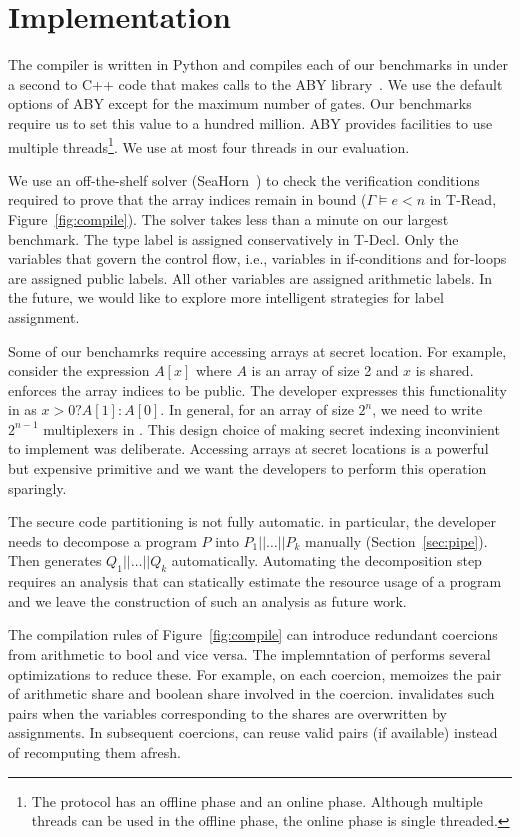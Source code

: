 \section{Implementation}
\label{sec:impl}
The  \tool compiler is written in Python and
compiles each of our benchmarks in under a second to C++ code that makes calls to the ABY
library~\cite{aby}. We use the default options of ABY except 
for the maximum number of gates. Our benchmarks require us to set this value to a
hundred million. ABY provides facilities to use multiple threads\footnote{The protocol has an offline phase and an online phase. Although multiple threads can be used in the offline phase, the online phase is single threaded.}.
We use at most four threads in our evaluation.

We use an off-the-shelf solver
(SeaHorn~\cite{seahorn}) to check the verification conditions required
to prove that the array indices remain in bound ($\Gamma\vDash e < n$ in {\sc T-Read}, Figure~\ref{fig:compile}). The solver takes less
than a minute on our largest benchmark.
The type label is assigned conservatively in  {\sc T-Decl}.
Only the variables that govern the control flow, i.e., variables
in if-conditions and for-loops are assigned public labels.
All other variables are assigned arithmetic labels.
In the future, we would like to explore more intelligent strategies for label assignment.

Some of our benchamrks require accessing arrays at secret location.
For example, consider the expression $A[x]$ where $A$ is an array of size 2 and $x$ is shared.
\tool enforces the array indices to be public. The developer expresses this functionality in \tool
as $x > 0 ? A[1] : A[0]$. In general, for an array of size $2^n$, we need to write $2^{n-1}$ multiplexers
in \tool. This design choice of making secret indexing inconvinient to implement was deliberate.
Accessing arrays at secret locations is a powerful but expensive primitive
and we want the developers to perform this operation sparingly. 

The secure code partitioning is not fully automatic.
in particular, the developer needs to decompose a program $P$ into $P_1||\ldots||P_k$ manually (Section~\ref{sec:pipe}). Then \tool generates $Q_1||\ldots||Q_k$ automatically.
Automating the decomposition step requires an analysis that can 
statically estimate the resource usage of a \tool program and we leave the construction of such
an analysis as future work.

The compilation rules of Figure~\ref{fig:compile} can introduce redundant coercions from arithmetic to
bool and vice versa.
The implemntation of \tool performs several optimizations to reduce these.
For example, on each coercion, \tool memoizes the pair of arithmetic share and boolean share involved in the coercion.
\tool invalidates such pairs when the variables corresponding to the shares are overwritten by assignments.
In subsequent coercions, \tool can reuse valid pairs (if available) instead of recomputing them afresh. 
 